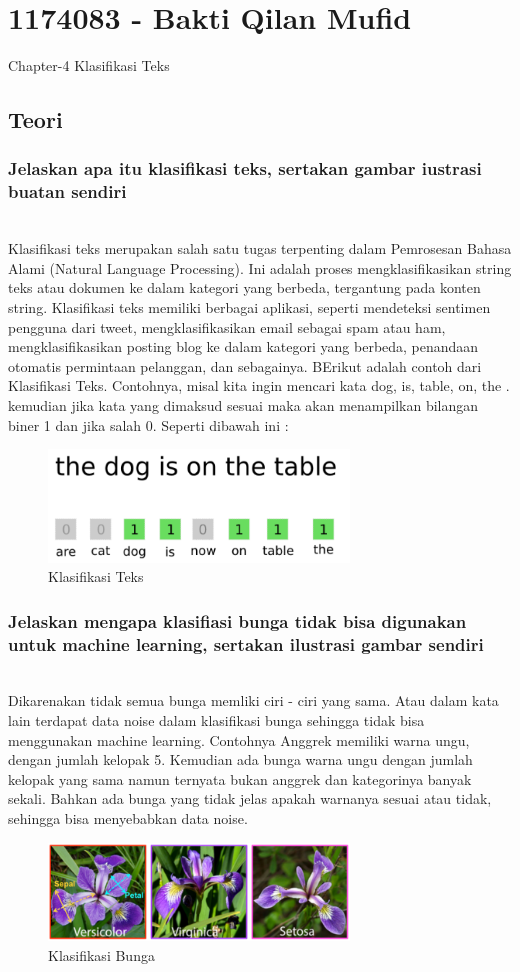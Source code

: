 \section{1174083 - Bakti Qilan Mufid}
Chapter-4 Klasifikasi Teks
\subsection{Teori}
\subsubsection{Jelaskan apa itu klasifikasi teks, sertakan gambar iustrasi buatan sendiri}
\hfill\\
Klasifikasi teks merupakan salah satu tugas terpenting dalam Pemrosesan Bahasa Alami (Natural Language Processing). Ini adalah proses mengklasifikasikan string teks atau dokumen ke dalam kategori yang berbeda, tergantung pada konten string. Klasifikasi teks memiliki berbagai aplikasi, seperti mendeteksi sentimen pengguna dari tweet, mengklasifikasikan email sebagai spam atau ham, mengklasifikasikan posting blog ke dalam kategori yang berbeda, penandaan otomatis permintaan pelanggan, dan sebagainya. BErikut adalah contoh dari Klasifikasi Teks. Contohnya, misal kita ingin mencari kata dog, is, table, on, the . kemudian jika kata yang dimaksud sesuai maka akan menampilkan bilangan biner 1 dan jika salah 0. Seperti dibawah ini :
\begin{figure}[H]
	\centering
	\includegraphics[width=8cm]{figures/1174083/figures4/1.png}
	\caption{Klasifikasi Teks}
\end{figure}

\subsubsection{Jelaskan mengapa klasifiasi bunga tidak bisa digunakan untuk machine learning, sertakan ilustrasi gambar sendiri}
\hfill\\
Dikarenakan tidak semua bunga memliki ciri - ciri yang sama. Atau dalam kata lain terdapat data noise dalam klasifikasi bunga sehingga tidak bisa menggunakan machine learning. Contohnya Anggrek memiliki warna ungu, dengan jumlah kelopak 5. Kemudian ada bunga warna ungu dengan jumlah kelopak yang sama namun ternyata bukan anggrek dan kategorinya banyak sekali. Bahkan ada bunga yang tidak jelas apakah warnanya sesuai atau tidak, sehingga bisa menyebabkan data noise.
\begin{figure}[H]
	\centering
	\includegraphics[width=8cm]{figures/1174083/figures4/2.png}
	\caption{Klasifikasi Bunga}
\end{figure}

